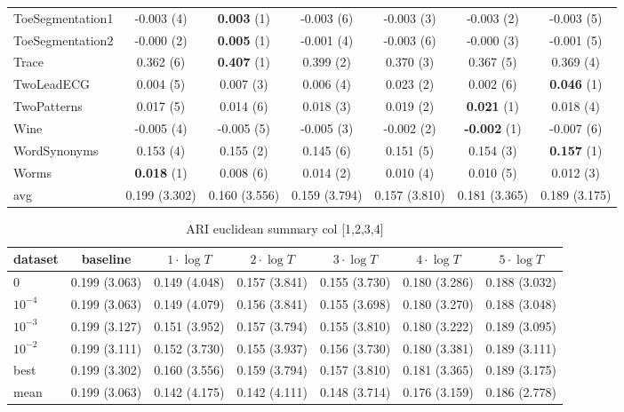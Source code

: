 \begin{table}[ht]
\begin{adjustbox}{width=\textwidth}
\begin{tabular}{lcccccc}
ToeSegmentation1 & -0.003 (4) & \textbf{0.003} (1) & -0.003 (6) & -0.003 (3) & -0.003 (2) & -0.003 (5) \\
ToeSegmentation2 & -0.000 (2) & \textbf{0.005} (1) & -0.001 (4) & -0.003 (6) & -0.000 (3) & -0.001 (5) \\
Trace & 0.362 (6) & \textbf{0.407} (1) & 0.399 (2) & 0.370 (3) & 0.367 (5) & 0.369 (4) \\
TwoLeadECG & 0.004 (5) & 0.007 (3) & 0.006 (4) & 0.023 (2) & 0.002 (6) & \textbf{0.046} (1) \\
TwoPatterns & 0.017 (5) & 0.014 (6) & 0.018 (3) & 0.019 (2) & \textbf{0.021} (1) & 0.018 (4) \\
Wine & -0.005 (4) & -0.005 (5) & -0.005 (3) & -0.002 (2) & \textbf{-0.002} (1) & -0.007 (6) \\
WordSynonyms & 0.153 (4) & 0.155 (2) & 0.145 (6) & 0.151 (5) & 0.154 (3) & \textbf{0.157} (1) \\
Worms & \textbf{0.018} (1) & 0.008 (6) & 0.014 (2) & 0.010 (4) & 0.010 (5) & 0.012 (3) \\
\hline 
avg & 0.199 (3.302) & 0.160 (3.556) & 0.159 (3.794) & 0.157 (3.810) & 0.181 (3.365) & 0.189 (3.175) \\ 
\hline
\end{tabular}
\end{adjustbox}
\end{table}



\begin{table}[ht]
\caption{ARI euclidean summary col [1,2,3,4]} 
\begin{adjustbox}{width=\textwidth}
\begin{tabular}{lcccccc}
\hline
dataset & baseline & \textbf{$1\cdot \log{T}$} & \textbf{$2\cdot \log{T}$} & \textbf{$3\cdot \log{T}$} & \textbf{$4\cdot \log{T}$} & \textbf{$5\cdot \log{T}$} \\ \hline
$0$ & 0.199 (3.063) & 0.149 (4.048) & 0.157 (3.841) & 0.155 (3.730) & 0.180 (3.286) & 0.188 (3.032) \\ 
$10^{-4}$ & 0.199 (3.063) & 0.149 (4.079) & 0.156 (3.841) & 0.155 (3.698) & 0.180 (3.270) & 0.188 (3.048) \\ 
$10^{-3}$ & 0.199 (3.127) & 0.151 (3.952) & 0.157 (3.794) & 0.155 (3.810) & 0.180 (3.222) & 0.189 (3.095) \\ 
$10^{-2}$ & 0.199 (3.111) & 0.152 (3.730) & 0.155 (3.937) & 0.156 (3.730) & 0.180 (3.381) & 0.189 (3.111) \\ 
best & 0.199 (3.302) & 0.160 (3.556) & 0.159 (3.794) & 0.157 (3.810) & 0.181 (3.365) & 0.189 (3.175) \\ 
mean & 0.199 (3.063) & 0.142 (4.175) & 0.142 (4.111) & 0.148 (3.714) & 0.176 (3.159) & 0.186 (2.778) \\ 
\hline
\end{tabular}
\end{adjustbox}
\end{table}



